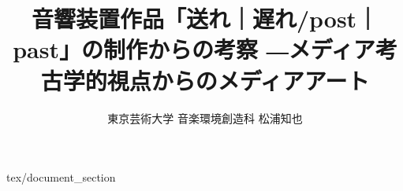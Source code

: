 \documentclass[report]{jsbook}
\title {音響装置作品「送れ｜遅れ/post｜past」の制作からの考察 ―メディア考古学的視点からのメディアアート}
\author {東京芸術大学 音楽環境創造科 松浦知也}
\begin{document}
\maketitle

\tableofcontents

 {tex/document_section}


\printbibliography[title = "参考文献"]
\end{document}

